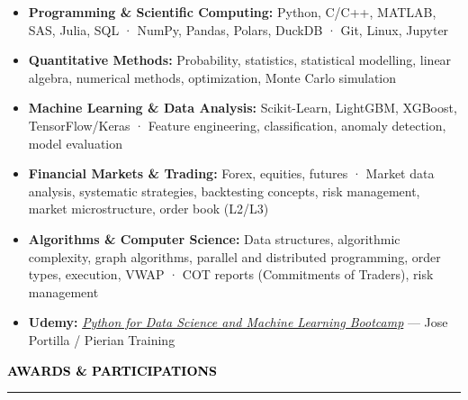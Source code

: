 \documentclass[10pt,english,french]{article}
\newcommand{\awardIcon}[1][black]{\textcolor{#1}{\faTrophy}}
\newcommand{\cvsection}[1]{
    \vspace{4pt}
    \textbf{\fontsize{9pt}{10pt}\selectfont \textcolor{black}{#1}}
    \vspace{6pt}
    \hrule
    \vspace{6pt}
}
\begin{document}
\vspace{-4pt}
\begin{itemize}[leftmargin=0.5cm, label=\textbullet, itemsep=0.12em]

    \item \textbf{Programming \& Scientific Computing\!:}
          Python, C/C++, MATLAB, SAS, Julia, SQL ·
          NumPy, Pandas, Polars, DuckDB ·
          Git, Linux, Jupyter

    \item \textbf{Quantitative Methods\!:}
          Probability, statistics, statistical modelling, linear algebra,
          numerical methods, optimization, Monte Carlo simulation

    \item \textbf{Machine Learning \& Data Analysis\!:}
          Scikit-Learn, LightGBM, XGBoost, TensorFlow/Keras ·
          Feature engineering, classification, anomaly detection,
          model evaluation

    \item \textbf{Financial Markets \& Trading\!:}
          Forex, equities, futures ·
          Market data analysis, systematic strategies, backtesting concepts,
          risk management, market microstructure, order book (L2/L3)

    \item \textbf{Algorithms \& Computer Science\!:}
          Data structures, algorithmic complexity,
          graph algorithms, parallel and distributed programming, order types, execution, VWAP ·
          COT reports (Commitments of Traders), risk management


    \item \textbf{Udemy\!:}
          \href{https://www.udemy.com/certificate/UC-51319000-ccb8-4c9c-9320-6cd9860e601c/}
          {\textit{Python for Data Science and Machine Learning Bootcamp}}
          --- Jose Portilla / Pierian Training
\end{itemize}

\vspace{-3pt}
\cvsection{\awardIcon[black]\hspace{4pt}AWARDS \& PARTICIPATIONS}
\end{document}
